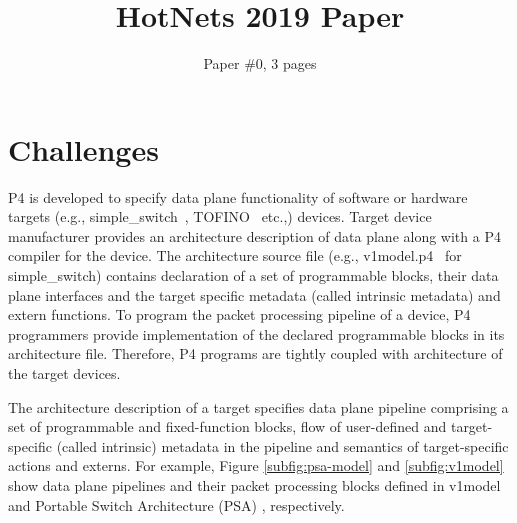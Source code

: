\documentclass{hotnets19}
\begin{document}


\title{HotNets 2019 Paper}

\author{Paper \#0, 3 pages}

\maketitle

\begin{abstract}



\end{abstract}




\section{Challenges}
P4 is developed to specify data plane functionality of software or hardware targets (e.g., simple\_\-switch~\cite{simple_switch.md}, TOFINO~\cite{tofino} etc.,) devices.
Target device manufacturer provides an architecture description of data plane along with a P4 compiler for the device.
The architecture source file (e.g., v1model.p4~\cite{v1model.p4} for simple\_switch) contains declaration of a set of pro\-gram\-ma\-ble blocks, their data plane interfaces and the target specific metadata (called intrinsic metadata) and extern functions.
To program the packet processing pipeline of a device, P4 programmers provide implementation of the declared programmable blocks in its architecture file.
Therefore, P4 programs are tightly coupled with architecture of the target devices.


The architecture description of a target specifies data plane pipeline comprising a set of pro\-gram\-ma\-ble and fixed-function blocks, flow of user-defined and target-specific (called intrinsic) metadata in the pipeline and semantics of target-specific actions and externs.
For example, Figure \ref{subfig:psa-model} and \ref{subfig:v1model} show data plane pipelines and their packet processing blocks defined in v1model~\cite{simple_switch.md} and Portable Switch Architecture (PSA) \cite{psa}, respectively.
\end{document}
